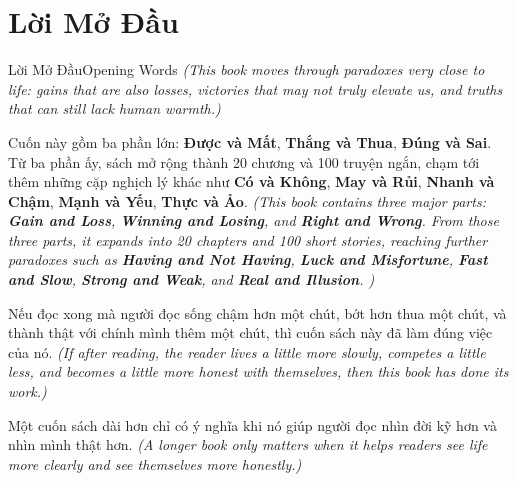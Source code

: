 \chapter*{Lời Mở Đầu}

\begin{truyen}{Lời Mở Đầu}{Opening Words}
\textit{(This book moves through paradoxes very close to life: gains that are also losses, victories that may not truly elevate us, and truths that can still lack human warmth.)}

Cuốn này gồm ba phần lớn: \textbf{Được và Mất}, \textbf{Thắng và Thua}, \textbf{Đúng và Sai}. Từ ba phần ấy, sách mở rộng thành 20 chương và 100 truyện ngắn, chạm tới thêm những cặp nghịch lý khác như \textbf{Có và Không}, \textbf{May và Rủi}, \textbf{Nhanh và Chậm}, \textbf{Mạnh và Yếu}, \textbf{Thực và Ảo}.
\textit{(This book contains three major parts: \textbf{Gain and Loss}, \textbf{Winning and Losing}, and \textbf{Right and Wrong}. From those three parts, it expands into 20 chapters and 100 short stories, reaching further paradoxes such as \textbf{Having and Not Having}, \textbf{Luck and Misfortune}, \textbf{Fast and Slow}, \textbf{Strong and Weak}, and \textbf{Real and Illusion}. )}

Nếu đọc xong mà người đọc sống chậm hơn một chút, bớt hơn thua một chút, và thành thật với chính mình thêm một chút, thì cuốn sách này đã làm đúng việc của nó.
\textit{(If after reading, the reader lives a little more slowly, competes a little less, and becomes a little more honest with themselves, then this book has done its work.)}
\end{truyen}

\begin{baihoc}
Một cuốn sách dài hơn chỉ có ý nghĩa khi nó giúp người đọc nhìn đời kỹ hơn và nhìn mình thật hơn.
\textit{(A longer book only matters when it helps readers see life more clearly and see themselves more honestly.)}
\end{baihoc}
\ngancach